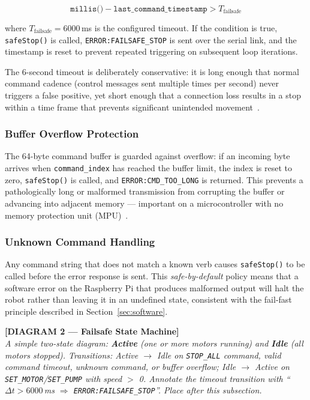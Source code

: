 \begin{equation}
\texttt{millis()} - \texttt{last\_command\_timestamp} > T_{\text{failsafe}}
\end{equation}

\noindent where $T_{\text{failsafe}} = 6000$\,ms is the configured
timeout. If the condition is true, \texttt{safeStop()} is called,
\texttt{ERROR:FAILSAFE\_STOP} is sent over the serial link, and the
timestamp is reset to prevent repeated triggering on subsequent
loop iterations.

The 6-second timeout is deliberately conservative: it is long enough
that normal command cadence (control messages sent multiple times per
second) never triggers a false positive, yet short enough that a
connection loss results in a stop within a time frame that prevents
significant unintended movement~\cite{kopetz2011real}.

\subsubsection{Buffer Overflow Protection}

The 64-byte command buffer is guarded against overflow: if an incoming
byte arrives when \texttt{command\_index} has reached the buffer limit,
the index is reset to zero, \texttt{safeStop()} is called, and
\texttt{ERROR:CMD\_TOO\_LONG} is returned. This prevents a
pathologically long or malformed transmission from corrupting the
buffer or advancing into adjacent memory — important on a
microcontroller with no memory protection unit
(MPU)~\cite{atmel2015atmega328p}.

\subsubsection{Unknown Command Handling}

Any command string that does not match a known verb causes
\texttt{safeStop()} to be called before the error response is sent.
This \emph{safe-by-default} policy means that a software error on the
Raspberry Pi that produces malformed output will halt the robot rather
than leaving it in an undefined state, consistent with the fail-fast
principle described in Section~\ref{sec:software}.

\bigskip
\noindent\textbf{[DIAGRAM 2 — Failsafe State Machine]}\\
\textit{A simple two-state diagram: \textbf{Active} (one or more
motors running) and \textbf{Idle} (all motors stopped). Transitions:
Active $\to$ Idle on \texttt{STOP\_ALL} command, valid command
timeout, unknown command, or buffer overflow; Idle $\to$ Active on
\texttt{SET\_MOTOR}/\texttt{SET\_PUMP} with speed $>$ 0. Annotate
the timeout transition with ``$\Delta t > 6000$\,ms $\Rightarrow$
\texttt{ERROR:FAILSAFE\_STOP}''. Place after this subsection.}
\bigskip

